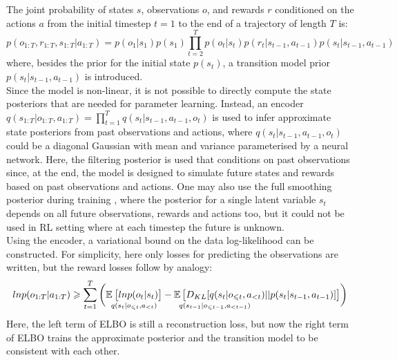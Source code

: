 The joint probability of states $s$, observations $o$, and rewards $r$ conditioned on the actions $a$ from the initial timestep $t = 1$ to the end of a trajectory of length $T$ is:
$$p(o_{1:T}, r_{1:T}, s_{1:T} | a_{1:T}) = p(o_1|s_1)p(s_1) \prod^T_{t=2} p(o_t|s_t)p(r_t|s_{t-1}, a_{t-1})p(s_t|s_{t−1}, a_{t−1})$$
where, besides the prior for the initial state $p(s_t)$, a transition model prior $p(s_t|s_{t−1}, a_{t−1})$ is introduced. \\
Since the model is non-linear, it is not possible to directly compute the state posteriors that are needed for parameter learning. Instead, an encoder $q(s_{1:T} | o_{1:T}, a_{1:T}) = \prod^T_{t=1} q(s_t | s_{t−1}, a_{t−1}, o_t)$ is used to infer approximate state posteriors from past observations and actions, where $q(s_t | s_{t−1}, a_{t−1}, o_t)$ could be a diagonal Gaussian with mean and variance parameterised by a neural network. Here, the filtering posterior \cite{Algo.Filtering} is used that conditions on past observations since, at the end, the model is designed to simulate future states and rewards based on past observations and actions. One may also use the full smoothing posterior during training \cite{Algo.Smoothing}, where the posterior for a single latent variable $s_t$ depends on all future observations, rewards and actions too, but it could not be used in RL setting where at each timestep the future is unknown. \\
Using the encoder, a variational bound on the data log-likelihood can be constructed. For simplicity, here only losses for predicting the observations are written, but the reward losses follow by analogy:
$$ln p(o_{1:T} | a_{1:T}) \geqslant \sum^T_{t=1} \bigg( \underset{q(s_t|o_{\leqslant t}, a_{<t})}{\operatorname{\mathbb{E}}_{} \big[ ln p(o_t|s_t) \big]} - \underset{q(s_{t-1}|o_{\leqslant t-1}, a_{<t-1})\hphantom{offset==to=====left}}{\operatorname{\mathbb{E}} \big[ D_{KL}[q(s_t|o_{\leqslant t}, a_{<t})||p(s_t|s_{t-1}, a_{t-1})] \big]} \bigg)$$
Here, the left term of ELBO is still a reconstruction loss, but now the right term of ELBO trains the approximate posterior and the transition model to be consistent with each other.

